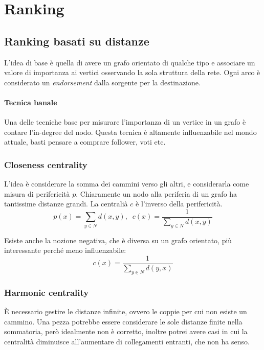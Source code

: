 \section{Ranking}


\subsection{Ranking basati su distanze}

L'idea di base è quella di avere un grafo orientato di qualche tipo e associare 
un valore di importanza ai vertici osservando la sola struttura della rete.
Ogni arco è considerato un \emph{endorsement} dalla sorgente per la 
destinazione.

\paragraph{Tecnica banale}
Una delle tecniche base per misurare l'importanza di un vertice in un grafo 
è contare l'in-degree del nodo. Questa tecnica è altamente influenzabile nel 
mondo attuale, basti pensare a comprare follower, voti etc.

\subsubsection{Closeness centrality}
L'idea è considerare la somma dei cammini verso gli altri, e considerarla 
come misura di perifericità $p$. Chiaramente un nodo alla periferia di un grafo 
ha tantissime distanze grandi. La centralià $c$ è l'inverso della perifericità.
$$p(x) = \sum_{y \in N} d(x, y),\;\;c(x) = \frac{1}{\sum_{y \in N} d(x, y)}$$

Esiste anche la nozione negativa, che è diversa su un grafo orientato, più
interessante perché meno influenzabile:
$$c(x) = \frac{1}{\sum_{y \in N} d(y, x)}$$

\subsubsection{Harmonic centrality}
È necessario gestire le distanze infinite, ovvero le coppie per cui non 
esiste un cammino. Una pezza potrebbe essere considerare le sole distanze finite
nella sommatoria, però idealmente non è corretto, inoltre potrei avere casi in 
cui la centralità diminuisce all'aumentare di collegamenti entranti, che non ha 
senso.

